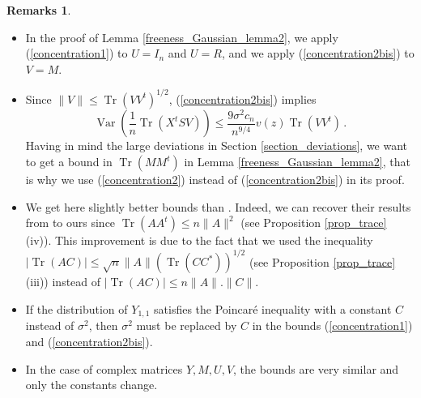 \documentclass[11pt,a4paper]{article}
\DeclareMathOperator{\1}{\mathbf{1}}
\DeclareMathOperator{\Var}{\mathrm{Var}}
\DeclareMathOperator{\Tr}{\mathrm{Tr}}
\theoremstyle{definition}
\newtheorem*{Remarks}{Remarks}
\begin{document}
\begin{Remarks}
\begin{itemize}
\item In the proof of Lemma \ref{freeness_Gaussian_lemma2}, we apply (\ref{concentration1}) to $U=I_n$ and $U=R$, and we apply (\ref{concentration2bis}) to $V=M$.
\item Since $\|V\| \le \Tr(VV^t)^{1/2}$, (\ref{concentration2bis}) implies
\begin{equation} \label{concentration2}
\Var \left( \frac1n \Tr(X^tSV) \right) \le \frac{9 \sigma^2 c_n}{n^{9/4}} v(z) \Tr(VV^t) \, .
\end{equation}
Having in mind the large deviations in Section \ref{section_deviations}, we want to get a bound in $\Tr(MM^t)$ in Lemma \ref{freeness_Gaussian_lemma2}, that is why we use (\ref{concentration2}) instead of (\ref{concentration2bis}) in its proof.
\item We get here slightly better bounds than \cite{VLM}. Indeed, we can recover their results from to ours since $\Tr(AA^t) \le n\|A\|^2$ (see Proposition \ref{prop_trace} (iv)). This improvement is due to the fact that we used the inequality $|\Tr(AC)| \le \sqrt{n} \|A\| (\Tr(CC^*))^{1/2}$ (see Proposition \ref{prop_trace} (iii)) instead of $|\Tr(AC)| \le n \|A\|.\|C\|$.
\item If the distribution of $Y_{1,1}$ satisfies the Poincar\'e inequality with a constant $C$ instead of $\sigma^2$, then $\sigma^2$ must be replaced by $C$ in the bounds (\ref{concentration1}) and (\ref{concentration2bis}).
\item In the case of complex matrices $Y, M, U, V$, the bounds are very similar and only the constants change.
\end{itemize}
\end{Remarks}
\end{document}
